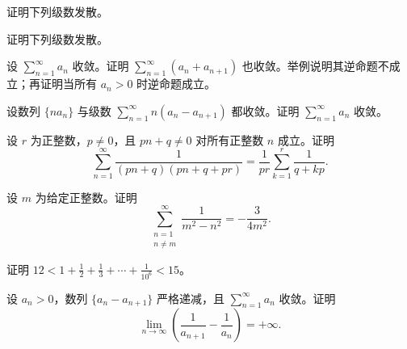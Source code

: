 \newpage
\noindent\begin{minipage}{\textwidth}
证明下列级数发散。
\end{minipage}\par\vfill
\noindent\begin{minipage}{\textwidth}
证明下列级数发散。
\end{minipage}\par\vfill
\noindent\begin{minipage}{\textwidth}
设 $\sum_{n=1}^{\infty}a_n$ 收敛。证明 $\sum_{n=1}^{\infty}(a_n+a_{n+1})$ 也收敛。举例说明其逆命题不成立；再证明当所有 $a_n>0$ 时逆命题成立。
\end{minipage}\par\vfill
\newpage
\noindent\begin{minipage}{\textwidth}
设数列 $\{na_n\}$ 与级数 $\sum_{n=1}^{\infty}n(a_n-a_{n+1})$ 都收敛。证明 $\sum_{n=1}^{\infty}a_n$ 收敛。
\end{minipage}\par\vfill
\noindent\begin{minipage}{\textwidth}
设 $r$ 为正整数，$p\ne0$，且 $pn+q\ne0$ 对所有正整数 $n$ 成立。证明\[\sum_{n=1}^{\infty}\frac1{(pn+q)(pn+q+pr)}=\frac1{pr}\sum_{k=1}^r\frac1{q+kp}.\]
\end{minipage}\par\vfill
\noindent\begin{minipage}{\textwidth}
设 $m$ 为给定正整数。证明\[\sum_{\substack{n=1\\n\ne m}}^{\infty}\frac1{m^2-n^2}=-\frac3{4m^2}.\]
\end{minipage}\par\vfill
\newpage
\noindent\begin{minipage}{\textwidth}
证明 $\displaystyle12<1+\frac12+\frac13+\cdots+\frac1{10^6}<15$。
\end{minipage}\par\vfill
\noindent\begin{minipage}{\textwidth}
设 $a_n>0$，数列 $\{a_n-a_{n+1}\}$ 严格递减，且 $\sum_{n=1}^{\infty}a_n$ 收敛。证明\[\lim_{n\to\infty}\left(\frac1{a_{n+1}}-\frac1{a_n}\right)=+\infty.\]
\end{minipage}\par\vfill
